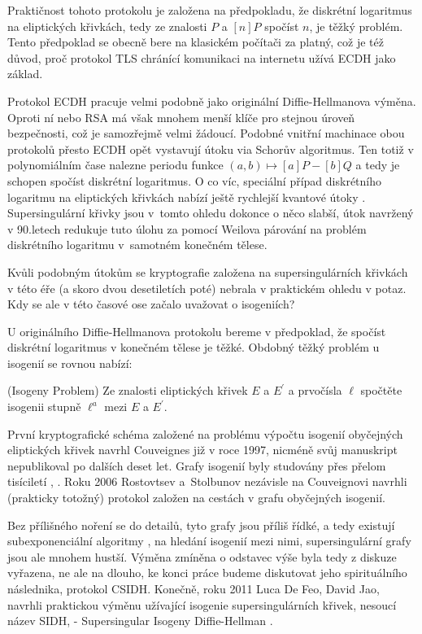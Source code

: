 \documentclass[12pt]{report}
\begin{document}
Praktičnost tohoto protokolu je založena na předpokladu, že diskrétní logaritmus na eliptických křivkách, tedy ze znalosti $P$ a $[n]P$ spočíst $n$, je těžký problém. Tento předpoklad se obecně bere na klasickém počítači za platný, což je též důvod, proč protokol TLS chránící komunikaci na internetu užívá ECDH jako základ.

Protokol ECDH pracuje velmi podobně jako originální Diffie-Hellmanova výměna. Oproti ní nebo RSA má však mnohem menší klíče pro stejnou úroveň bezpečnosti, což je samozřejmě velmi žádoucí. Podobné vnitřní machinace obou protokolů přesto ECDH opět vystavují útoku via Schorův algoritmus. Ten totiž v polynomiálním čase nalezne periodu funkce $(a,b) \mapsto [a]P - [b]Q$ a tedy je schopen spočíst diskrétní logaritmus. O co víc, speciální případ diskrétního logaritmu na eliptických křivkách nabízí ještě rychlejší kvantové útoky \cite{Proos}. Supersingulární křivky jsou v~tomto ohledu dokonce o něco slabší, útok navržený v 90.letech \cite{MOV} redukuje tuto úlohu za pomocí Weilova párování na problém diskrétního logaritmu v~samotném konečném tělese.

Kvůli podobným útokům se kryptografie založena na supersingulárních křivkách v této éře (a skoro dvou desetiletích poté) nebrala v praktickém ohledu v potaz. Kdy se ale v této časové ose začalo uvažovat o isogeniích?

U originálního Diffie-Hellmanova protokolu bereme v předpoklad, že spočíst diskrétní logaritmus v konečném tělese je těžké. Obdobný těžký problém u isogenií se rovnou nabízí:

\begin{problem} (Isogeny Problem)
Ze znalosti eliptických křivek $E$ a $E^\prime$ a prvočísla $\ell$ spočtěte isogenii stupně $\ell^a$ mezi $E$ a $E^\prime$.
\end{problem}

První kryptografické schéma založené na problému výpočtu isogenií obyčejných eliptických křivek navrhl Couveignes \cite{Couveignes} již v roce 1997, nicméně svůj manuskript nepublikoval po dalších deset let. Grafy isogenií byly studovány přes přelom tisíciletí \cite{Galbraith}, \cite{Galbraith2}. Roku 2006 Rostovtsev a~Stolbunov \cite{Stolbunov} nezávisle na Couveignovi navrhli (prakticky totožný) protokol založen na cestách v grafu obyčejných isogenií. 

Bez přílišného noření se do detailů, tyto grafy jsou příliš řídké, a tedy existují subexponenciální algoritmy \cite{Galbraith3}, \cite{Childs} na hledání isogenií mezi nimi, supersingulární grafy jsou ale mnohem hustší. Výměna zmíněna o odstavec výše byla tedy z diskuze vyřazena, ne ale na dlouho, ke konci práce budeme diskutovat jeho spirituálního následnika, protokol CSIDH. Konečně, roku 2011 Luca De Feo, David Jao, navrhli praktickou výměnu užívající isogenie supersingulárních křivek, nesoucí název SIDH, - Supersingular Isogeny Diffie-Hellman \cite{DeFeo3}.
\end{document}
